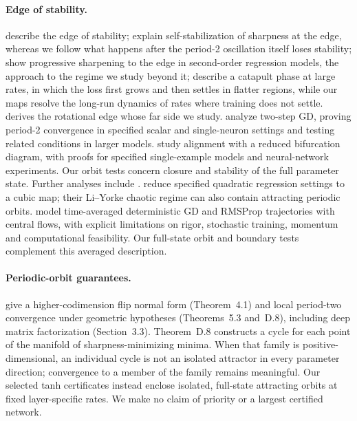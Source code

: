 \documentclass[11pt,letterpaper]{article}
\begin{document}
\paragraph{Edge of stability.} \citet{cohen2021} describe the edge of stability; \citet{damian2023} explain
self-stabilization of sharpness at the edge, whereas we follow what happens after the period-2 oscillation itself
loses stability; \citet{agarwala2023} show progressive sharpening to the edge in second-order regression models,
the approach to the regime we study beyond it; \citet{lewkowycz2020} describe a catapult phase at large rates, in
which the loss first grows and then settles in flatter regions, while our maps resolve the long-run dynamics of
rates where training does not settle. \citet{hofmann2026} derives the rotational edge whose far side we study.
\citet{chenbruna2023} analyze two-step GD, proving period-2 convergence in specified scalar and single-neuron
settings and testing related conditions in larger models. \citet{song2023} study alignment with a reduced
bifurcation diagram, with proofs for specified single-example models and neural-network experiments. Our orbit
tests concern closure and stability of the full parameter state. Further analyses include \citet{kalra2025}.
\citet{chen2024phases} reduce specified quadratic regression settings to a cubic map; their Li--Yorke
chaotic regime can also contain attracting periodic orbits. \citet{cohen2025central} model time-averaged deterministic GD and RMSProp
trajectories with central flows, with explicit limitations on rigor, stochastic training, momentum and
computational feasibility. Our full-state orbit and boundary tests complement this averaged description.

\paragraph{Periodic-orbit guarantees.} \citet{macdonaldvidal2026} give a higher-codimension flip normal form
(Theorem~4.1) and local period-two convergence under geometric hypotheses (Theorems~5.3 and~D.8), including
deep matrix factorization (Section~3.3). Theorem~D.8 constructs a cycle for each point of the manifold of sharpness-minimizing
minima. When that family is positive-dimensional, an individual cycle is not an isolated attractor in every
parameter direction; convergence to a member of the family remains meaningful. Our selected tanh certificates
instead enclose isolated, full-state attracting orbits at fixed layer-specific rates. We make no claim of priority
or a largest certified network.
\end{document}
